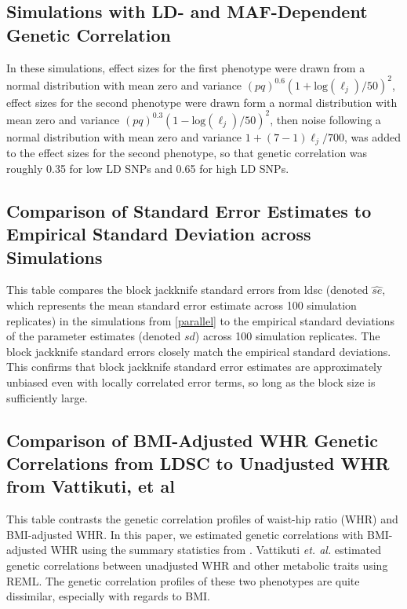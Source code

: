 \documentclass[11pt]{article}
\numberwithin{equation}{section}
\numberwithin{definition}{section}
\numberwithin{thm}{section}
\numberwithin{lemma}{section}
\numberwithin{prop}{section}
\numberwithin{cor}{section}
\numberwithin{hyp}{section}
\begin{document}
\subsection{Simulations with LD- and MAF-Dependent Genetic Correlation}
\label{depcor}


In these simulations, effect sizes for the first phenotype were drawn from a normal distribution with mean zero and variance
$(pq)^{0.6}(1+\mathrm{log}(\ell_j)/50)^2$, 
effect sizes for the second phenotype were drawn form a normal distribution with mean zero and variance
$(pq)^{0.3}(1-\mathrm{log}(\ell_j)/50)^2$,
then noise following a normal distribution with mean zero and variance 
$ 1+(7-1)\ell_j/700$,
was added to the effect sizes for the second phenotype, so that genetic correlation was roughly 0.35 for low LD SNPs and 
0.65 for high LD SNPs.   

%


\newpage
\subsection{Comparison of Standard Error Estimates to Empirical Standard Deviation across Simulations}
\label{se_sim}

This table compares the block jackknife standard errors from ldsc (denoted $\widehat{se}$, which represents the mean standard error estimate across 100 simulation replicates) in the simulations from \ref{parallel} to the empirical standard deviations of the parameter estimates (denoted $sd$) across 100 simulation replicates. The block jackknife standard errors closely match the empirical standard deviations. This confirms that block jackknife standard error estimates are approximately unbiased even with locally correlated error terms, so long as the block size is sufficiently large.
\newpage
\subsection{Comparison of BMI-Adjusted WHR Genetic Correlations from LDSC to Unadjusted WHR from Vattikuti, et al}
\label{whr}


This table contrasts the genetic correlation profiles of waist-hip ratio (WHR) and BMI-adjusted WHR.
In this paper, we estimated genetic correlations with BMI-adjusted WHR using the summary statistics from \cite{heid2010meta}.
Vattikuti \emph{et. al.} \cite{vattikuti2012heritability}
estimated genetic correlations between unadjusted WHR and other metabolic traits using REML. 
The genetic correlation profiles of these two phenotypes are quite dissimilar, especially with regards to BMI.

%




\newpage


\end{document}
